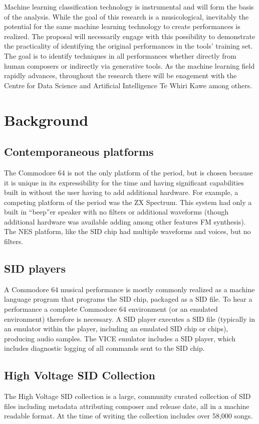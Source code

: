\documentclass[10pt]{article}
\begin{document}
\begin{multicols*}{2}
  Machine learning classification technology is instrumental and will
  form the basis of the analysis. While the goal of this research is a
  musicological, inevitably the potential for the same machine
  learning technology to create performances is realized. The proposal
  will necessarily engage with this possibility to demonstrate the
  practicality of identifying the original performances in the tools'
  training set. The goal is to identify techniques in all performances
  whether directly from human composers or indirectly via generative
  tools.  As the machine learning field rapidly advances, throughout
  the research there will be enagement with the Centre for Data
  Science and Artificial Intelligence Te Whiri Kawe among others.

  \section{Background}

  \subsection{Contemporaneous platforms}
  The Commodore 64 is not the only platform of the period, but is
  chosen because it is unique in its expressibility for the time and
  having significant capabilities built in without the user having to
  add additional hardware. For example, a competing platform of the
  period was the ZX Spectrum. This system had only a built in
  ``beep''er speaker with no filters or additional waveforms (though
  additional hardware was available adding among other features
  FM synthesis). The NES platform, like the SID chip had multiple
  waveforms and voices, but no filters.

  \subsection{SID players}
  A Commodore 64 musical performance is mostly commonly realized as a
  machine language program that programs the SID chip, packaged as a
  SID file. To hear a performance a complete Commodore 64 environment
  (or an emulated environment) therefore is necessary. A SID player
  executes a SID file (typically in an emulator within the player,
  including an emulated SID chip or chips), producing audio samples.
  The VICE emulator includes a SID player, which includes diagnostic
  logging of all commands sent to the SID chip.

  \subsection{High Voltage SID Collection}
  The High Voltage SID collection is a large, community curated
  collection of SID files including metadata attributing composer
  and release date, all in a machine readable format. At the time
  of writing the collection includes over 58,000 songs.


\end{multicols*}
\end{document}
